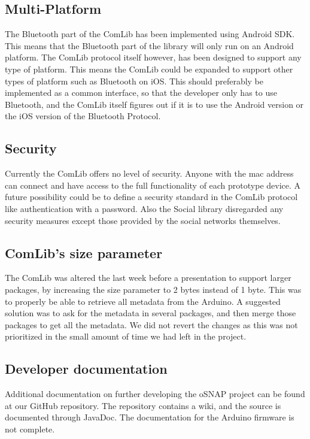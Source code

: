\subsection{Multi-Platform}
The Bluetooth part of the ComLib has been implemented using Android SDK. This means that 
the Bluetooth part of the library will only run on an Android platform. The ComLib protocol
itself however, has been designed to support any type of platform. This means the ComLib
could be expanded to support other types of platform such as Bluetooth on iOS. This
should preferably be implemented as a common interface, so that the developer only has to use
Bluetooth, and the ComLib itself figures out if it is to use the Android version or the iOS version of
the Bluetooth Protocol.

\subsection{Security}
Currently the ComLib offers no level of security. Anyone with the mac address can connect
and have access to the full functionality of each prototype device. A future possibility could
be to define a security standard in the ComLib protocol like authentication with a password.
Also the Social library disregarded any security measures except those provided by
the social networks themselves.

\subsection{ComLib's size parameter}
The ComLib was altered the last week before a presentation to support larger packages, by increasing the size parameter to 2 bytes instead of 1 byte. This was to properly
be able to retrieve all metadata from the Arduino. A suggested solution was to ask for the metadata
in several packages, and then merge those packages to get all the metadata. We did not revert the changes
as this was not prioritized in the small amount of time we had left in the project.

\subsection{Developer documentation}
Additional documentation on further developing the oSNAP project can be found at our GitHub repository\cite{link:github-osnap}.
The repository contains a wiki, and the source is documented through JavaDoc. The documentation for the Arduino firmware is not complete.

